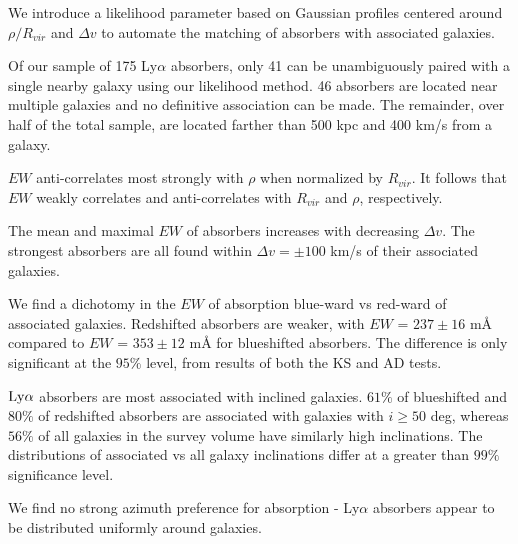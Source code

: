 \documentclass[iop]{emulateapj-rtx4}
\begin{document}
\indent \textbullet \indent We introduce a likelihood parameter based on Gaussian profiles centered around $\rho / R_{vir}$ and $\Delta v$ to automate the matching of absorbers with associated galaxies. 

\indent \textbullet \indent  Of our sample of 175 Ly$\alpha$ absorbers, only 41 can be unambiguously paired with a single nearby galaxy using our likelihood method. 46 absorbers are located near multiple galaxies and no definitive association can be made. The remainder, over half of the total sample, are located farther than 500 kpc and 400 km/s from a galaxy.

\indent \textbullet \indent $EW$ anti-correlates most strongly with $\rho$ when normalized by $R_{vir}$. It follows that $EW$ weakly correlates and anti-correlates with $R_{vir}$ and $\rho$, respectively.

\indent \textbullet \indent The mean and maximal $EW$ of absorbers increases with decreasing $\Delta v$. The strongest absorbers are all found within $\Delta v = \pm 100$ km/s of their associated galaxies.

\indent \textbullet \indent We find a dichotomy in the $EW$ of absorption blue-ward vs red-ward of associated galaxies. Redshifted absorbers are weaker, with $EW$ = $237 \pm 16$ $\textrm{m\AA}$ compared to $EW$ = $353 \pm 12$ $\textrm{m\AA}$ for blueshifted absorbers. The difference is only significant at the $95\%$ level, from results of both the KS and AD tests.


\textbullet \indent $\rm Ly\alpha$ absorbers are most associated with inclined galaxies. $61\%$ of blueshifted and $80\%$ of redshifted absorbers are associated with galaxies with $i \geq 50$ deg, whereas $56\%$ of all galaxies in the survey volume have similarly high inclinations. The distributions of associated vs all galaxy inclinations differ at a greater than $99\%$ significance level.

\indent \textbullet \indent We find no strong azimuth preference for absorption - Ly$\alpha$ absorbers appear to be distributed uniformly around galaxies.

\nocite{*}


\end{document}

